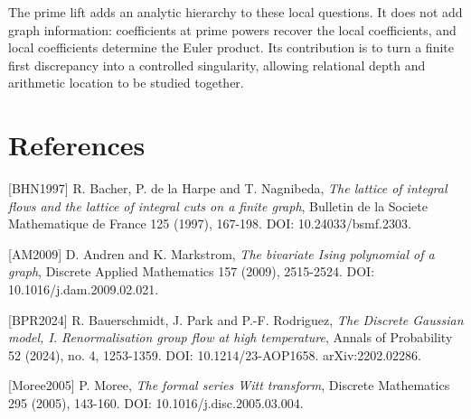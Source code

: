 \documentclass[
  11pt,
  a4paper,
]{article}
\begin{document}
The prime lift adds an analytic hierarchy to these local questions. It
does not add graph information: coefficients at prime powers recover the
local coefficients, and local coefficients determine the Euler product.
Its contribution is to turn a finite first discrepancy into a controlled
singularity, allowing relational depth and arithmetic location to be
studied together.

\hypertarget{references}{%
\section*{References}\label{references}}

{[}BHN1997{]} R. Bacher, P. de la Harpe and T. Nagnibeda, \emph{The
lattice of integral flows and the lattice of integral cuts on a finite
graph}, Bulletin de la Societe Mathematique de France 125 (1997),
167-198. DOI: 10.24033/bsmf.2303.

{[}AM2009{]} D. Andren and K. Markstrom, \emph{The bivariate Ising
polynomial of a graph}, Discrete Applied Mathematics 157 (2009),
2515-2524. DOI: 10.1016/j.dam.2009.02.021.

{[}BPR2024{]} R. Bauerschmidt, J. Park and P.-F. Rodriguez, \emph{The
Discrete Gaussian model, I. Renormalisation group flow at high
temperature}, Annals of Probability 52 (2024), no. 4, 1253-1359. DOI:
10.1214/23-AOP1658. arXiv:2202.02286.

{[}Moree2005{]} P. Moree, \emph{The formal series Witt transform},
Discrete Mathematics 295 (2005), 143-160. DOI:
10.1016/j.disc.2005.03.004.
\end{document}

